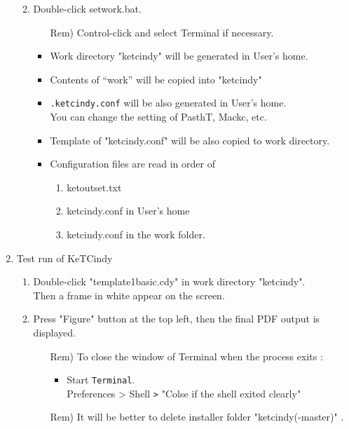 \documentclass{article}
\begin{document}
\begin{enumerate}[\bf\large 1.]
\begin{enumerate}[(1)]
\begin{itemize}
    \end{itemize}
    \item Double-click setwork.bat.
    \begin{itemize}
    \item[Rem)]Control-click and select Terminal if necessary. 
    \end{itemize}
    \begin{itemize}
    \item Work directory "ketcindy" will be generated in User's home.
    \item Contents of “work” will be copied into "ketcindy"
    \item \verb|.ketcindy.conf| will be also generated in User's home.\\
    \hspace*{10mm}You can change the setting of PasthT, Mackc, etc.
    \item Template of "ketcindy.conf" will be also copied to work directory.
    \item Configuration files are read in order of 
      \begin{enumerate}[1)]
      \item ketoutset.txt
      \item ketcindy.conf in User's home
      \item ketcindy.conf in the work folder.
      \end{enumerate}
    \end{itemize}
  \end{enumerate}

\item Test run of KeTCindy
 \begin{enumerate}[(1)]
  \item Double-click "template1basic.cdy" in work directory "ketcindy".\\
  \hspace*{10mm}Then a frame in white appear on the screen.  
  \item Press "Figure" button at the top left, then the final PDF output is displayed. 
    \begin{itemize}
    \item[Rem)]To close the window of Terminal when the process exits :
      \begin{itemize}
      \item Start \verb|Terminal|.\\
      \hspace*{10mm}Preferences > Shell \verb|>| "Colse if the shell exited clearly"
      \end{itemize}
    \item[Rem)]It will be better to delete installer folder "ketcindy(-master)" .
    \end{itemize} 
  \end{enumerate}


\end{enumerate}
\end{document}
